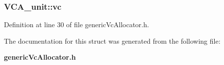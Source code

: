 \subsubsection[{vc}]{ {\bf VCA\_\-unit::vc}}\label{structVCA__unit_468896aa83862c58830625a4d32727c7}




Definition at line 30 of file genericVcAllocator.h.

The documentation for this struct was generated from the following file:\begin{CompactItemize}
\item 
{\bf genericVcAllocator.h}\end{CompactItemize}
